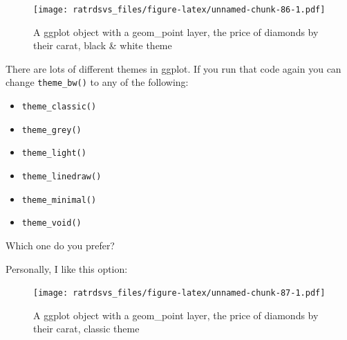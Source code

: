 \documentclass[
]{book}
\newenvironment{Shaded}{\begin{snugshade}}{\end{snugshade}}
\newcommand{\DataTypeTok}[1]{\textcolor[rgb]{0.13,0.29,0.53}{#1}}
\newcommand{\DecValTok}[1]{\textcolor[rgb]{0.00,0.00,0.81}{#1}}
\newcommand{\FloatTok}[1]{\textcolor[rgb]{0.00,0.00,0.81}{#1}}
\newcommand{\KeywordTok}[1]{\textcolor[rgb]{0.13,0.29,0.53}{\textbf{#1}}}
\newcommand{\NormalTok}[1]{#1}
\newcommand{\OperatorTok}[1]{\textcolor[rgb]{0.81,0.36,0.00}{\textbf{#1}}}
\newcommand{\StringTok}[1]{\textcolor[rgb]{0.31,0.60,0.02}{#1}}
\begin{document}
\begin{figure}
\centering
\texttt{[image: ratrdsvs\_files/figure-latex/unnamed-chunk-86-1.pdf]}
\caption{\label{fig:unnamed-chunk-86}A ggplot object with a geom\_point layer, the price of diamonds by their carat, black \& white theme}
\end{figure}

There are lots of different themes in ggplot. If you run that code again you can change \texttt{theme\_bw()} to any of the following:

\begin{itemize}
\item
  \texttt{theme\_classic()}
\item
  \texttt{theme\_grey()}
\item
  \texttt{theme\_light()}
\item
  \texttt{theme\_linedraw()}
\item
  \texttt{theme\_minimal()}
\item
  \texttt{theme\_void()}
\end{itemize}

Which one do you prefer?

Personally, I like this option:

\begin{Shaded}
\end{Shaded}

\begin{figure}
\centering
\texttt{[image: ratrdsvs\_files/figure-latex/unnamed-chunk-87-1.pdf]}
\caption{\label{fig:unnamed-chunk-87}A ggplot object with a geom\_point layer, the price of diamonds by their carat, classic theme}
\end{figure}
\end{document}
